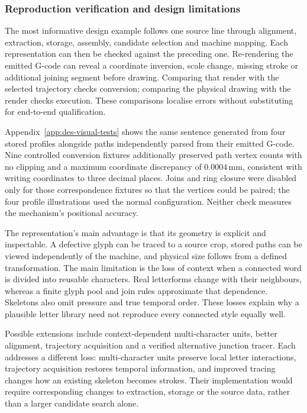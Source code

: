 \subsubsection{Reproduction verification and design limitations}
The most informative design example follows one source line through alignment, extraction, storage, assembly, candidate selection and machine mapping. Each representation can then be checked against the preceding one. Re-rendering the emitted G-code can reveal a coordinate inversion, scale change, missing stroke or additional joining segment before drawing. Comparing that render with the selected trajectory checks conversion; comparing the physical drawing with the render checks execution. These comparisons localise errors without substituting for end-to-end qualification.

Appendix~\ref{app:des-visual-tests} shows the same sentence generated from four stored profiles alongside paths independently parsed from their emitted G-code. Nine controlled conversion fixtures additionally preserved path vertex counts with no clipping and a maximum coordinate discrepancy of $0.0004$\,mm, consistent with writing coordinates to three decimal places. Joins and ring closure were disabled only for those correspondence fixtures so that the vertices could be paired; the four profile illustrations used the normal configuration. Neither check measures the mechanism's positional accuracy.

The representation's main advantage is that its geometry is explicit and inspectable. A defective glyph can be traced to a source crop, stored paths can be viewed independently of the machine, and physical size follows from a defined transformation. The main limitation is the loss of context when a connected word is divided into reusable characters. Real letterforms change with their neighbours, whereas a finite glyph pool and join rules approximate that dependence. Skeletons also omit pressure and true temporal order. These losses explain why a plausible letter library need not reproduce every connected style equally well.

Possible extensions include context-dependent multi-character units, better alignment, trajectory acquisition and a verified alternative junction tracer. Each addresses a different loss: multi-character units preserve local letter interactions, trajectory acquisition restores temporal information, and improved tracing changes how an existing skeleton becomes strokes. Their implementation would require corresponding changes to extraction, storage or the source data, rather than a larger candidate search alone.
\FloatBarrier
